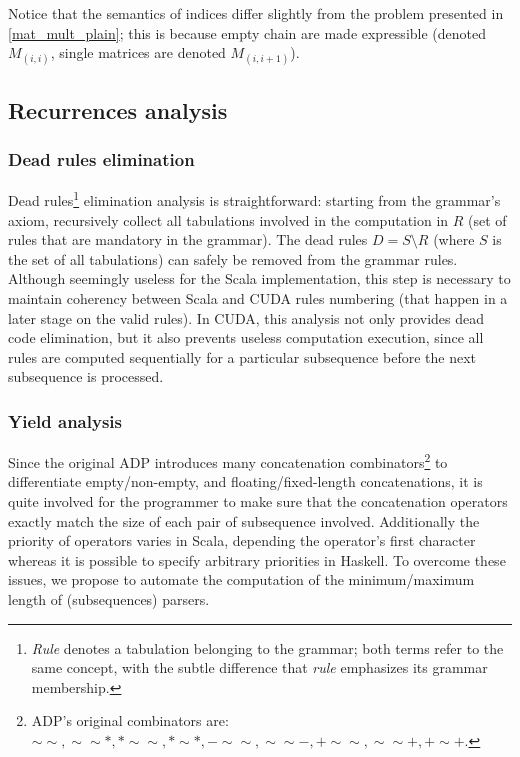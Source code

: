 Notice that the semantics of indices differ slightly from the problem presented in \ref{mat_mult_plain}; this is because empty chain are made expressible (denoted $M_{(i,i)}$, single matrices are denoted $M_{(i,i+1)}$).

\subsection{Recurrences analysis} \label{recurrences}
\subsubsection{Dead rules elimination}
Dead rules\footnote{\textit{Rule} denotes a tabulation belonging to the grammar; both terms refer to the same concept, with the subtle difference that \textit{rule} emphasizes its grammar membership.} elimination analysis is straightforward: starting from the grammar's axiom, recursively collect all tabulations involved in the computation in $R$ (set of rules that are mandatory in the grammar). The dead rules $D=S \setminus R$ (where $S$ is the set of all tabulations) can safely be removed from the grammar rules. Although seemingly useless for the Scala implementation, this step is necessary to maintain coherency between Scala and CUDA rules numbering (that happen in a later stage on the valid rules). In CUDA, this analysis not only provides dead code elimination, but it also prevents useless computation execution, since all rules are computed sequentially for a particular subsequence before the next subsequence is processed.

\subsubsection{Yield analysis} \label{yield_analysis}
Since the original ADP introduces many concatenation combinators\footnote{ADP's original combinators are: $\sim\sim, \sim\sim*, *\sim\sim, *\sim*, -\sim\sim, \sim\sim-, +\sim\sim, \sim\sim+, +\sim+$.} to differentiate empty/non-empty, and floating/fixed-length concatenations, it is quite involved for the programmer to make sure that the concatenation operators exactly match the size of each pair of subsequence involved. Additionally the priority of operators varies in Scala, depending the operator's first character whereas it is possible to specify arbitrary priorities in Haskell. To overcome these issues, we propose to automate the computation of the minimum/maximum length of (subsequences) parsers.

